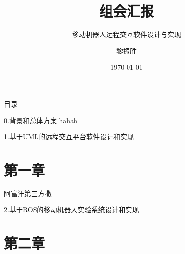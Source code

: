 \documentclass{beamer}
\title{组会汇报}
\subtitle{移动机器人远程交互软件设计与实现}
\institute{中南大学机电工程学院}
\author{黎振胜}
\date{\today}
\begin{document}
\begin{frame}
\maketitle
\end{frame}
\begin{frame}[t]{目录}
 \tableofcontents
\end{frame}
\begin{frame}[t]{0.背景和总体方案}
    hahah
\end{frame}
\begin{frame}[t]{1.基于UML的远程交互平台软件设计和实现}
    \section{第一章}
    阿富汗第三方撒
\end{frame}
\begin{frame}[t]{2.基于ROS的移动机器人实验系统设计和实现}
    \section{第二章}
\end{frame}
\end{document}

